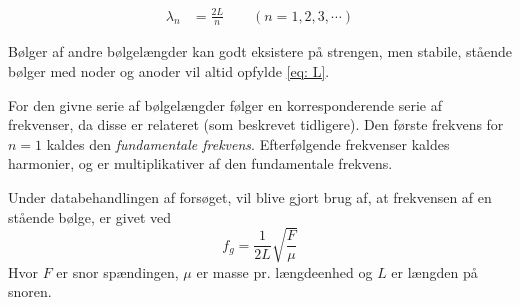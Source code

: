 \documentclass[A2_main.tex]{subfiles}
\begin{document}
\begin{align}
    \lambda_n &= \frac{2L}{n} \qquad (n=1,2,3,\cdots)
    \label{eq: L}
\end{align}

Bølger af andre bølgelængder kan godt eksistere på strengen, men stabile, stående bølger med noder og anoder vil altid opfylde \cref{eq: L}.

For den givne serie af bølgelængder følger en korresponderende serie af frekvenser, da disse er relateret (som beskrevet tidligere). Den første frekvens for $n=1$ kaldes den \emph{fundamentale frekvens}. Efterfølgende frekvenser kaldes harmonier, og er multiplikativer af den fundamentale frekvens.

Under databehandlingen af forsøget, vil blive gjort brug af, at frekvensen af en stående bølge, er givet ved
\begin{equation}
 f_g = \frac{1}{2L}\sqrt{\frac{F}{\mu}}
 \label{eq: swave}
\end{equation}
Hvor $F$ er snor spændingen, $\mu$ er masse pr. længdeenhed og $L$ er længden på snoren.
\end{document}
